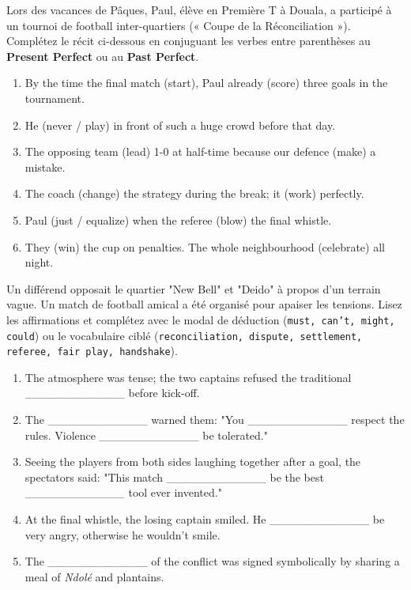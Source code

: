 \documentclass[11pt]{article}
\begin{document}
\begin{exercice}
Lors des vacances de Pâques, Paul, élève en Première T à Douala, a participé à un tournoi de football inter-quartiers (« Coupe de la Réconciliation »). Complétez le récit ci-dessous en conjuguant les verbes entre parenthèses au \textbf{Present Perfect} ou au \textbf{Past Perfect}.
\begin{enumerate}
    \item By the time the final match (start), Paul already (score) three goals in the tournament.
    \item He (never / play) in front of such a huge crowd before that day.
    \item The opposing team (lead) 1-0 at half-time because our defence (make) a mistake.
    \item The coach (change) the strategy during the break; it (work) perfectly.
    \item Paul (just / equalize) when the referee (blow) the final whistle.
    \item They (win) the cup on penalties. The whole neighbourhood (celebrate) all night.
\end{enumerate}
\end{exercice}

\begin{exercice}
Un différend opposait le quartier "New Bell" et "Deido" à propos d'un terrain vague. Un match de football amical a été organisé pour apaiser les tensions. Lisez les affirmations et complétez avec le modal de déduction (\texttt{must, can't, might, could}) ou le vocabulaire ciblé (\texttt{reconciliation, dispute, settlement, referee, fair play, handshake}).
\begin{enumerate}
    \item The atmosphere was tense; the two captains refused the traditional \_\_\_\_\_\_\_\_\_\_\_\_ before kick-off.
    \item The \_\_\_\_\_\_\_\_\_\_\_\_ warned them: "You \_\_\_\_\_\_\_\_\_\_\_\_ respect the rules. Violence \_\_\_\_\_\_\_\_\_\_\_\_ be tolerated."
    \item Seeing the players from both sides laughing together after a goal, the spectators said: "This match \_\_\_\_\_\_\_\_\_\_\_\_ be the best \_\_\_\_\_\_\_\_\_\_\_\_ tool ever invented."
    \item At the final whistle, the losing captain smiled. He \_\_\_\_\_\_\_\_\_\_\_\_ be very angry, otherwise he wouldn't smile.
    \item The \_\_\_\_\_\_\_\_\_\_\_\_ of the conflict was signed symbolically by sharing a meal of \textit{Ndolé} and plantains.
\end{enumerate}
\end{exercice}
\end{document}
